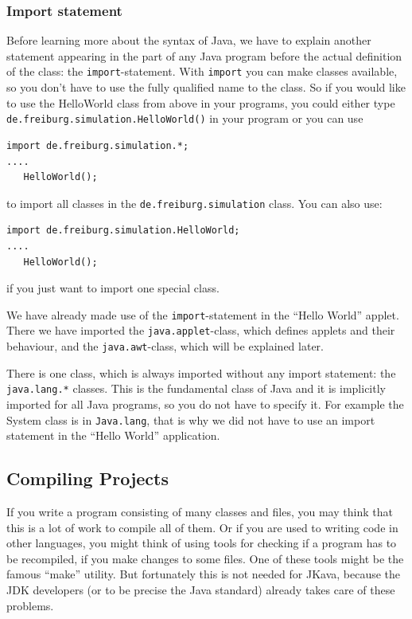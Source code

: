 \subsubsection{Import statement}
Before learning more about the syntax of Java, we have to explain another
statement appearing in the part of any Java program before the actual
definition of the class: the \verb|import|-statement. With \verb|import|
you can make classes available, so you don't have to use the fully
qualified name to the class. So if you would like to
use the HelloWorld class from above in your programs, you could either
type \verb|de.freiburg.simulation.HelloWorld()| in your program
or you can use
\begin{verbatim}
import de.freiburg.simulation.*;
....
   HelloWorld();
\end{verbatim}
to import all classes in the \verb|de.freiburg.simulation| class.
You can also use:
\begin{verbatim}
import de.freiburg.simulation.HelloWorld;
....
   HelloWorld();
\end{verbatim}
if you just want to import one special class.

We have already made use of the \verb|import|-statement in the ``Hello World'' 
applet. There we have imported the \verb|java.applet|-class, which
defines applets and their behaviour, and the \verb|java.awt|-class, which
will be explained later.
 
There is one class, which is always imported without any import statement:
the \verb|java.lang.*| classes. This is the fundamental class of Java and it is
implicitly imported for all Java programs, so you do not have to specify
it. For example the System class is in \verb|Java.lang|, that is why
we did not have to use an import statement in the ``Hello World''
application.  


\subsection{Compiling Projects}
If you write a program consisting of many classes and files, you
may think that this is a lot of work to compile all of them. Or if
you are used to writing code in other languages, you might think
of using tools for checking if a program has to be recompiled, if you make
changes to some files. One of these tools might be the famous ``make''
utility. But fortunately this is not needed for JKava, because
the JDK developers (or to be precise the Java standard) already
takes care of these problems. 

